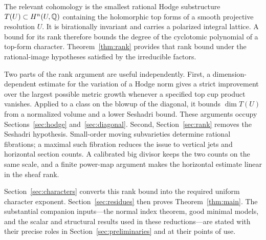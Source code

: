 The relevant cohomology is the smallest rational Hodge substructure
$T(U)\subset H^n(U,\mathbb Q)$ containing the holomorphic top forms of a smooth
projective resolution $U$. It is birationally invariant and carries a
polarized integral lattice. A bound for its rank therefore bounds the
degree of the cyclotomic polynomial of a top-form character. Theorem~\ref{thm:rank}
provides that rank bound under the rational-image hypotheses satisfied
by the irreducible factors.

Two parts of the rank argument are useful independently. First, a
dimension-dependent estimate for the variation of a Hodge norm gives a
strict improvement over the largest possible metric growth whenever a
specified top cup product vanishes. Applied to a class on the blowup of
the diagonal, it bounds $\dim T(U)$ from a normalized volume and a lower
Seshadri bound. These arguments occupy Sections~\ref{sec:hodge}
and~\ref{sec:diagonal}. Second, Section~\ref{sec:rank} removes the
Seshadri hypothesis. Small-order moving subvarieties determine rational
fibrations; a maximal such fibration reduces the issue to vertical jets
and horizontal section counts. A calibrated big divisor keeps the two
counts on the same scale, and a finite power-map argument makes the
horizontal estimate linear in the sheaf rank.

Section~\ref{sec:characters} converts this rank bound into the required
uniform character exponent. Section~\ref{sec:residues} then proves
Theorem~\ref{thm:main}. The substantial companion inputs---the normal
index theorem, good minimal models, and the scalar and structural
results used in these reductions---are stated with their precise roles
in Section~\ref{sec:preliminaries} and at their points of use.
